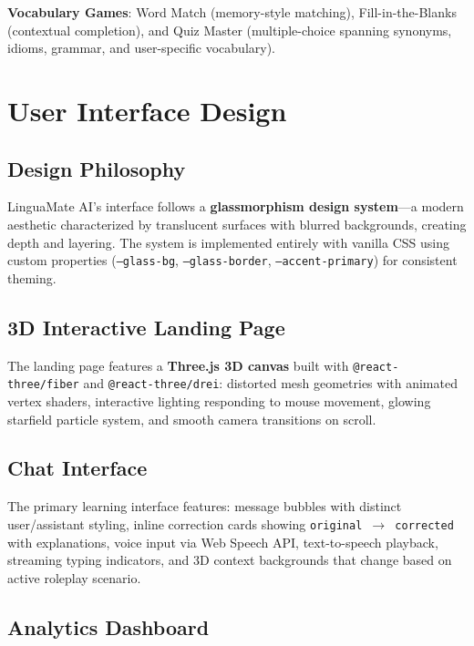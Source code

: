 \documentclass[conference]{IEEEtran}
\begin{document}
\textbf{Vocabulary Games}: Word Match (memory-style matching), Fill-in-the-Blanks (contextual completion), and Quiz Master (multiple-choice spanning synonyms, idioms, grammar, and user-specific vocabulary).

\section{User Interface Design}

\subsection{Design Philosophy}

LinguaMate AI's interface follows a \textbf{glassmorphism design system}---a modern aesthetic characterized by translucent surfaces with blurred backgrounds, creating depth and layering. The system is implemented entirely with vanilla CSS using custom properties (\texttt{--glass-bg}, \texttt{--glass-border}, \texttt{--accent-primary}) for consistent theming.

\subsection{3D Interactive Landing Page}

The landing page features a \textbf{Three.js 3D canvas} built with \texttt{@react-three/fiber} and \texttt{@react-three/drei}: distorted mesh geometries with animated vertex shaders, interactive lighting responding to mouse movement, glowing starfield particle system, and smooth camera transitions on scroll.

\subsection{Chat Interface}

The primary learning interface features: message bubbles with distinct user/assistant styling, inline correction cards showing \texttt{original $\rightarrow$ corrected} with explanations, voice input via Web Speech API, text-to-speech playback, streaming typing indicators, and 3D context backgrounds that change based on active roleplay scenario.

\subsection{Analytics Dashboard}
\end{document}
